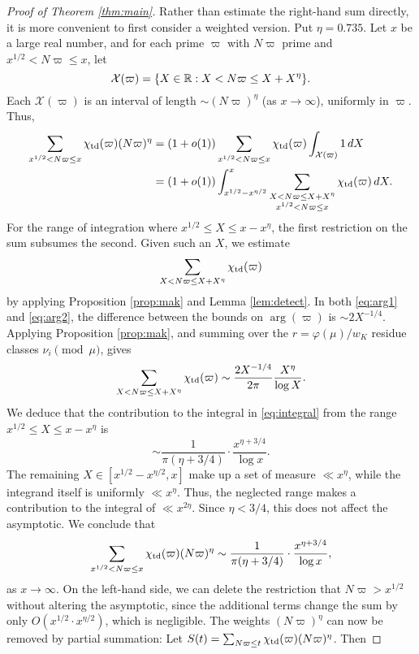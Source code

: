 \documentclass[12pt]{amsart}
\theoremstyle{remark}
\begin{document}
\begin{proof}[Proof of Theorem \ref{thm:main}]
Rather than estimate the right-hand sum directly, it is more convenient to first consider a weighted version.  Put $\eta = 0.735$. Let $x$ be a large real number, and for each prime $\varpi$ with $N\varpi$ prime and $x^{1/2} < N\varpi \le x$, let 
\[ \mathcal{X}(\varpi)= \{X \in \mathbb{R}: X< N\varpi \le X + X^{\eta}\}. \]
Each $\mathcal{X}(\varpi)$ is an interval of length $\sim (N\varpi)^{\eta}$ (as $x\to\infty$), uniformly in $\varpi$. Thus,
\begin{align} \sum_{x^{1/2} < N\varpi \le x} \chi_{\mathrm{td}}(\varpi) (N\varpi)^{\eta} &= (1+o(1)) \sum_{x^{1/2} < N\varpi \le x}\chi_{\mathrm{td}}(\varpi) \int_{\mathcal{X}(\varpi)} 1\, dX \notag\\
&=(1+o(1)) \int_{x^{1/2} - x^{\eta/2}}^{x} \sum_{\substack{X < N\varpi \le X+X^{\eta} \\ x^{1/2} < N\varpi\le x}} \chi_{\mathrm{td}}(\varpi) \, dX. \label{eq:integral}\end{align}
For the range of integration where $x^{1/2} \le X \le x-x^{\eta}$, the first restriction on the sum subsumes the second. Given such an $X$, we estimate
\[ \sum_{X < N\varpi \le X+X^{\eta}} \chi_{\mathrm{td}}(\varpi) \]
by applying Proposition \ref{prop:mak} and Lemma \ref{lem:detect}. In both \eqref{eq:arg1} and \eqref{eq:arg2}, the difference between the bounds on $\arg(\varpi)$ is $\sim 2X^{-1/4}$. Applying Proposition \ref{prop:mak}, and summing over the $r=\varphi(\mu)/w_K$ residue classes $\nu_i\pmod{\mu}$, gives
\[ \sum_{X < N\varpi \le X+X^{\eta}} \chi_{\mathrm{td}}(\varpi) \sim \frac{2X^{-1/4}}{2\pi} \frac{X^{\eta}}{\log{X}}. \]
We deduce that the contribution to the integral in \eqref{eq:integral} from the range $x^{1/2} \le X \le x-x^{\eta}$ is
\[ \sim \frac{1}{\pi(\eta+3/4)} \cdot \frac{x^{\eta+3/4}}{\log{x}}.\]
The remaining $X \in [x^{1/2}-x^{\eta/2}, x]$ make up a set of measure $\ll x^{\eta}$, while the integrand itself is uniformly $\ll x^{\eta}$. Thus, the neglected range makes a contribution to the integral of $\ll x^{2\eta}$.  Since $\eta < 3/4$, this does not affect the asymptotic. We conclude that
\begin{equation} \sum_{x^{1/2} < N\varpi \le x} \chi_{\mathrm{td}}(\varpi) (N\varpi)^{\eta} \sim  \frac{1}{\pi(\eta+3/4)} \cdot \frac{x^{\eta+3/4}}{\log{x}},\label{eq:Sxasymp} \end{equation} as $x\to\infty$. On the left-hand side, we can delete the restriction that $N\varpi > x^{1/2}$ without altering the asymptotic, since the additional terms change the sum by only $O(x^{1/2} \cdot x^{\eta/2})$, which is negligible. The weights $(N\varpi)^{\eta}$ can now be removed by partial summation: Let $S(t) = \sum_{N\varpi \le t}\chi_{\mathrm{td}}(\varpi) (N\varpi)^{\eta}$. Then

\end{proof}
\end{document}
